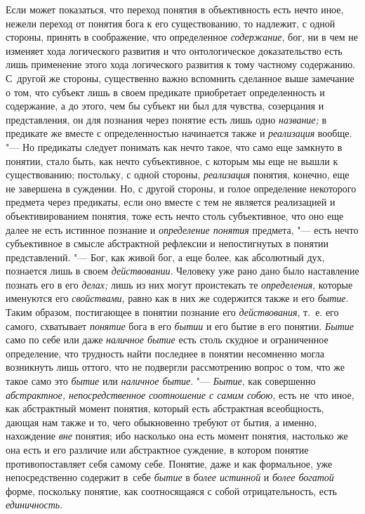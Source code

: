 Если может показаться, что переход понятия в объективность
есть нечто иное, нежели переход от понятия бога к его существованию, то
надлежит, с одной стороны, принять в соображение, что определенное
{\em содержание}, бог, ни
в чем не изменяет хода логического развития и что онтологическое
доказательство есть лишь применение этого хода логического развития к тому
частному содержанию. С~другой же стороны, существенно важно вспомнить
сделанное выше замечание о том, что субъект лишь в своем предикате
приобретает определенность и содержание, а до этого, чем бы субъект ни был
для чувства, созерцания и представления, он для познания через понятие есть
лишь одно {\em название;} в предикате же вместе с определенностью начинается
также и {\em реализация} вообще.
"--- Но предикаты следует понимать как нечто такое, что само еще
замкнуто в понятии, стало быть, как нечто субъективное, с которым мы еще не
вышли к существованию; постольку, с одной стороны, {\em реализация} понятия,
конечно, еще не завершена в суждении. Но, с другой стороны, и голое
определение некоторого предмета через предикаты, если оно вместе с тем не
является реализацией и объективированием понятия, тоже есть нечто столь
субъективное, что оно еще далее не есть истинное познание и
{\em определение понятия} предмета, "--- есть нечто субъективное в смысле
абстрактной рефлексии и непостигнутых в понятии представлений. "---
Бог, как живой бог, а еще более, как абсолютный дух,
познается лишь в своем {\em действовании}.
Человеку уже рано дано было наставление познать его в его
{\em делах;} лишь из них могут проистекать те {\em определения},
которые именуются его {\em свойствами}, равно
как в них же содержится также и его {\em бытие}. Таким
образом, постигающее в понятии познание его {\em действования}, т.~е.
его самого, схватывает {\em понятие} бога в его {\em бытии}
и его бытие в его понятии. {\em Бытие} само по себе
или даже {\em наличное бытие}
есть столь скудное и ограниченное определение, что трудность
найти последнее в понятии несомненно могла возникнуть лишь оттого, что не
подвергли рассмотрению вопрос о том, что же такое само это
{\em бытие} или {\em наличное бытие}. "--- {\em Бытие}, как
совершенно {\em абстрактное,
непосредственное соотношение с самим собою}, есть не~что иное,
как абстрактный момент понятия, который есть
абстрактная всеобщность, дающая нам также и то, чего обыкновенно требуют от
бытия, а именно, нахождение {\em вне}
понятия; ибо насколько она есть момент понятия, настолько же
она есть и его различие или абстрактное суждение, в котором понятие
противопоставляет себя самому себе. Понятие, даже и как формальное, уже
непосредственно содержит в~себе
{\em бытие} в {\em более истинной} и {\em более богатой}
форме, поскольку понятие, как соотносящаяся с собой
отрицательность, есть {\em единичность}.

